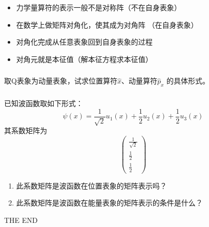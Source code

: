\begin{frame} [allowframebreaks=]
    \begin{tcolorbox}[colback=yellow!5,colframe=yellow!75!black,title=对角化的物理意义]
        \begin{itemize}
            \item 力学量算符的表示一般不是对称阵（不在自身表象）
            \item 在数学上做矩阵对角化，使其成为对角阵 （在自身表象）
            \item 对角化完成从任意表象回到自身表象的过程
            \item 对角元就是本征值（解本征方程求本征值）
        \end{itemize}  
    \end{tcolorbox}
\end{frame}

\begin{frame} 
    \frametitle{}
    \begin{tcolorbox}[colback=yellow!5,colframe=yellow!75!black,title=课堂作业]
    取Q表象为动量表象，试求位置算符$\hat{x}$、动量算符$\hat{p}_x$ 的具体形式。
    \end{tcolorbox}
\end{frame} 

\begin{frame} 
    \frametitle{}
    \begin{tcolorbox}[colback=yellow!5,colframe=yellow!75!black,title=课堂讨论1]
    已知波函数取如下形式：$$\psi(x)=\frac{1}{\sqrt{2}}u_1(x)+\frac{1}{2}u_2(x)+\frac{1}{2}u_3(x)$$
    其系数矩阵为$$\begin{pmatrix}
            \frac{1}{\sqrt{2}}\\
            \frac{1}{2}\\
            \frac{1}{2}
            \end{pmatrix}$$
    \begin{enumerate}
        \item  此系数矩阵是波函数在位置表象的矩阵表示吗？
        \item  此系数矩阵是波函数在能量表象的矩阵表示的条件是什么？  
    \end{enumerate}
    \end{tcolorbox}
\end{frame} 

\begin{frame} 
 THE END
\end{frame}

